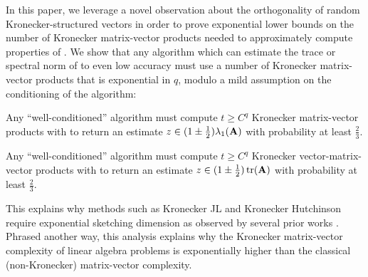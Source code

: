 In this paper, we leverage a novel observation about the orthogonality of random Kronecker-structured vectors in order to prove exponential lower bounds on the number of Kronecker matrix-vector products needed to approximately compute properties of \mA.
We show that any algorithm which can estimate the trace or spectral norm of \mA to even low accuracy must use a number of Kronecker matrix-vector products that is exponential in \(q\), modulo a mild assumption on the conditioning of the algorithm:
\begin{theorem}
    \label{thm:top-eig-lower-bound-informal}
    Any ``well-conditioned'' algorithm must compute \(t \geq C^q\) Kronecker matrix-vector products with \mA to return an estimate \(z \in (1\pm\frac12)\lambda_1(\mathbf{A})\) with probability at least \(\frac23\).
\end{theorem}
\begin{theorem}
    \label{thm:trace-lower-bound-informal}
    Any ``well-conditioned'' algorithm must compute \(t \geq C^q\) Kronecker vector-matrix-vector products with \mA to return an estimate \(z \in (1\pm\frac12)\operatorname{tr}(\mathbf{A})\) with probability at least \(\frac23\).
\end{theorem}
This explains why methods such as Kronecker JL and Kronecker Hutchinson require exponential sketching dimension as observed by several prior works \cite{meyer2023hutchinson, ahle2019almost}.
Phrased another way, this analysis explains why the Kronecker matrix-vector complexity of linear algebra problems is exponentially higher than the classical (non-Kronecker) matrix-vector complexity.

